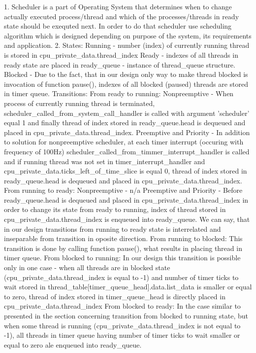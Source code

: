 1. 
Scheduler is a part of Operating System that determines when to change actually executed process/thread and which of the processes/threads in ready state should be exequted next. In order to do that scheduler use scheduling algorithm which is designed depending on purpose of the system, its requirements and application.
2.
States:
Running - number (index) of currently running thread is stored in cpu_private_data.thread_index
Ready - indexes of all threads in ready state are placed in ready_queue - instance of thread_queue structure.
Blocked - Due to the fact, that in our design only way to make thread blocked is invocation of function pause(), indexes of all blocked (paused) threads are stored in timer queue.
Transitions:
From ready to running:
Nonpreemptive - When process of currently running thread is terminated, scheduler_called_from_system_call_handler is called with argument 'scheduler' equal 1 and finally thread of index stored in ready_queue.head is dequeued and placed in cpu_private_data.thread_index.
Preemptive and Priority - In addition to solution for nonpreemptive scheduler, at each timer interrupt (occuring with frequency of 100Hz) scheduler_called_from_timmer_interrupt_handler is called and if running thread was not set in timer_interrupt_handler and cpu_private_data.ticks_left_of_time_slice is equal 0, thread of index stored in ready_queue.head is dequeued and placed in cpu_private_data.thread_index.
From running to ready:
Nonpreemptive - n/a
Preemptive and Priority - Before ready_queue.head is dequeued and placed in cpu_private_data.thread_index in order to change its state from ready to running, index of thread stored in cpu_private_data.thread_index is enqueued into ready_queue. We can say, that in our design transitions from running to ready state is interrelated and inseparable from transition in oposite direction.
From running to blocked:
This transition is done by calling function pause(), what results in placing thread in timer queue.
From blocked to running:
In our design this transition is possible only in one case - when all threads are in blocked state (cpu_private_data.thread_index is equal to -1) and number of timer ticks to wait stored in thread_table[timer_queue_head].data.list_data is smaller or equal to zero, thread of index stored in timer_queue_head is directly placed in cpu_private_data.thread_index
From blocked to ready:
In the case similar to presented in the section concerning transition from blocked to running state, but when some thread is running (cpu_private_data.thread_index is not equal to -1), all threads in timer queue having number of timer ticks to wait smaller or equal to zero ale enqueued into ready_queue.
